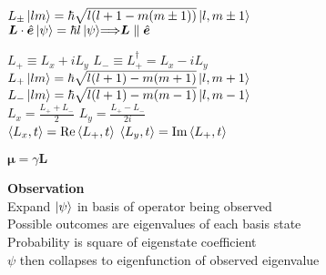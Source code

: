 \documentclass[11pt, a4paper]{article}
\newcommand{\newsec}[1]{\vspace{2mm}\textbf{#1}\\}
\renewcommand{\vec}[1]{\bm{#1}} %
\newcommand{\uvec}[1]{\hat{\vec{#1}}} %
\let\spaceyimplies\implies
\renewcommand{\implies}{\hspace{-1mm}\spaceyimplies\hspace{-1mm}}
\begin{document}
\begin{multicols}{2}
$L_\pm \ket{lm} = \hbar \sqrt{l(l+1 - m (m \pm 1))} \ket{l, m \pm 1}$ \medskip \\


$ \vec{L}\cdot \uvec{e} \ket{\psi} = \hbar l \ket{\psi} \implies \vec{L} \parallel \uvec{e} $

$ L_{+} \equiv L_{x} + i L_{y} $ \qquad $ L_{-} \equiv L_{+}^{\dagger} = L_{x} - i L_{y} $\\
$ L_{+}\ket{lm} = \hbar \sqrt{l (l+1) - m(m+1)} \ket{l, m+1} $ \\
$ L_{-}\ket{lm} = \hbar \sqrt{l (l+1) - m(m-1)} \ket{l, m-1}  $\\
$ L_{x} = \frac{L_{+} + L_{-}}{2} $ \qquad \qquad \quad  $ L_{y} = \frac{L_{+} - L_{-}}{2i} $\\
$ \ev{L_{x}, t} = \Re \ev{L_{+}, t} $ \qquad $ \ev{L_{y}, t}= \Im \ev{L_{+}, t} $

$ \bm{\mu} = \gamma \bm{L} $

\newsec{Observation}
Expand $ \ket{\psi} $ in basis of operator being observed\\
Possible outcomes are eigenvalues of each basis state\\
Probability is square of eigenstate coefficient\\
$ \psi $ then collapses to eigenfunction of observed eigenvalue


\end{multicols}
\end{document}
